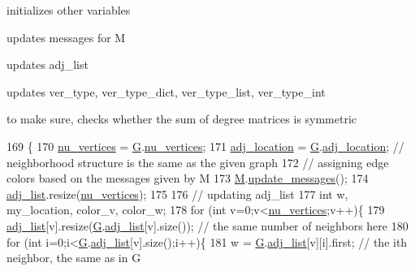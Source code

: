 initializes other variables 


\begin{DoxyItemize}
\item updates messages for M
\item updates adj\+\_\+list
\item updates ver\+\_\+type, ver\+\_\+type\+\_\+dict, ver\+\_\+type\+\_\+list, ver\+\_\+type\+\_\+int
\item to make sure, checks whether the sum of degree matrices is symmetric 
\end{DoxyItemize}
\begin{DoxyCode}
169 \{
170   \hyperlink{classcolored__graph_a90ece8eb1fec52f3f41549ab527c1d5b}{nu\_vertices} = \hyperlink{classcolored__graph_a39186b56cad58c368d6947656976e18d}{G}.\hyperlink{classmarked__graph_acf79c6aeb8f32614cb14a5baaa6c9f9b}{nu\_vertices};
171   \hyperlink{classcolored__graph_ad657e7e86bee874d19dbc1765e1edaa7}{adj\_location} = \hyperlink{classcolored__graph_a39186b56cad58c368d6947656976e18d}{G}.\hyperlink{classmarked__graph_a3ae722ea9583ad23af34d789a88ac01a}{adj\_location}; \textcolor{comment}{// neighborhood structure is the same as the
       given graph}
172   \textcolor{comment}{// assigning edge colors based on the messages given by M}
173   \hyperlink{classcolored__graph_ab72c568fe12f7c849ca6bffb145aec47}{M}.\hyperlink{classgraph__message_a611832eb2767873fbff7b07c5790570d}{update\_messages}();
174   \hyperlink{classcolored__graph_a45dce16965079286cf3f41a54a1b2ea4}{adj\_list}.resize(\hyperlink{classcolored__graph_a90ece8eb1fec52f3f41549ab527c1d5b}{nu\_vertices});
175 
176   \textcolor{comment}{// updating adj\_list}
177   \textcolor{keywordtype}{int} w, my\_location, color\_v, color\_w;
178   \textcolor{keywordflow}{for} (\textcolor{keywordtype}{int} v=0;v<\hyperlink{classcolored__graph_a90ece8eb1fec52f3f41549ab527c1d5b}{nu\_vertices};v++)\{
179     \hyperlink{classcolored__graph_a45dce16965079286cf3f41a54a1b2ea4}{adj\_list}[v].resize(\hyperlink{classcolored__graph_a39186b56cad58c368d6947656976e18d}{G}.\hyperlink{classmarked__graph_a1a0bf7ca413a278763f7c878b3b6fd6f}{adj\_list}[v].size()); \textcolor{comment}{// the same number of neighbors here}
180     \textcolor{keywordflow}{for} (\textcolor{keywordtype}{int} i=0;i<\hyperlink{classcolored__graph_a39186b56cad58c368d6947656976e18d}{G}.\hyperlink{classmarked__graph_a1a0bf7ca413a278763f7c878b3b6fd6f}{adj\_list}[v].size();i++)\{
181       w = \hyperlink{classcolored__graph_a39186b56cad58c368d6947656976e18d}{G}.\hyperlink{classmarked__graph_a1a0bf7ca413a278763f7c878b3b6fd6f}{adj\_list}[v][i].first; \textcolor{comment}{// the ith neighbor, the same as in G}

\end{DoxyCode}
